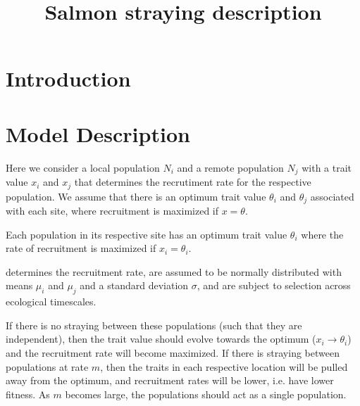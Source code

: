 \documentclass[onecolumn,preprintnumbers,amsmath,amssymb,superscriptaddress]{revtex4}
\begin{document}
\title{Salmon straying description}



\maketitle



\section*{Introduction}


\section*{Model Description}

Here we consider a local population $N_i$ and a remote population $N_j$ with a trait value $x_i$ and $x_j$ that determines the recrutiment rate for the respective population.
We assume that there is an optimum trait value $\theta_i$ and $\theta_j$ associated with each site, where recruitment is maximized if $x = \theta$.

Each population in its respective site has an optimum trait value $\theta_i$ where the rate of recruitment is maximized if $x_i = \theta_i$.

determines the recruitment rate, are assumed to be normally distributed with means $\mu_i$ and $\mu_j$ and a standard deviation $\sigma$, and are subject to selection across ecological timescales.

If there is no straying between these populations (such that they are independent), then the trait value should evolve towards the optimum ($x_i \rightarrow \theta_i$) and the recruitment rate will become maximized.
If there is straying between populations at rate $m$, then the traits in each respective location will be pulled away from the optimum, and recruitment rates will be lower, i.e. have lower fitness.
As $m$ becomes large, the populations should act as a single population.
\end{document}
